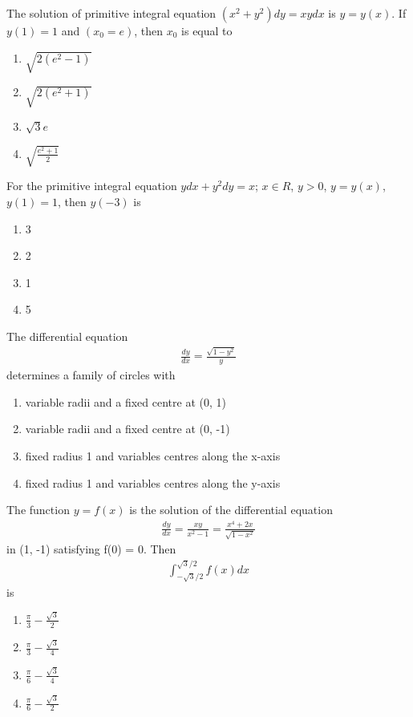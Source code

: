 \item The solution of primitive integral equation $(x^2 + y^2)dy = xydx$ is $y = y(x)$. If $y(1) = 1$ and $(x_0 = e)$, then $x_0$ is equal to
\begin{enumerate}
\item $\sqrt{2(e^2 - 1)}$
\item $\sqrt{2(e^2 + 1)}$
\item $\sqrt{3}e$
\item $\sqrt{\frac{e^2 + 1}{2}}$
\end{enumerate}

\item For the primitive integral equation $ydx + y^2dy = x$; $x \in R$, $y > 0$, $y = y(x)$, $y(1) = 1$, then $y(-3)$ is
\begin{enumerate}
\item 3
\item 2
\item 1
\item 5
\end{enumerate}

\item The differential equation 
\begin{align*}
\frac{dy}{dx} = \frac{\sqrt{1 - y^2}}{y}
\end{align*}
determines a family of circles with
\begin{enumerate}
\item variable radii and a fixed centre at (0, 1)
\item variable radii and a fixed centre at (0, -1)
\item fixed radius 1 and variables centres along the x-axis
\item fixed radius 1 and variables centres along the y-axis
\end{enumerate}

\item The function $y = f(x)$ is the solution of the differential equation
\begin{align*}
\frac{dy}{dx} = \frac{xy}{x^2 - 1} = \frac{x^4 + 2x}{\sqrt{1 - x^2}}
\end{align*}
in (1, -1) satisfying f(0) = 0. Then 
\begin{align*}
\int_{-\sqrt{3}/2}^{\sqrt{3}/2}f(x)dx
\end{align*}
is
\begin{enumerate}
\item $\frac{\pi}{3} - \frac{\sqrt{3}}{2}$
\item $\frac{\pi}{3} - \frac{\sqrt{3}}{4}$
\item $\frac{\pi}{6} - \frac{\sqrt{3}}{4}$
\item $\frac{\pi}{6} - \frac{\sqrt{3}}{2}$ 
\end{enumerate}

